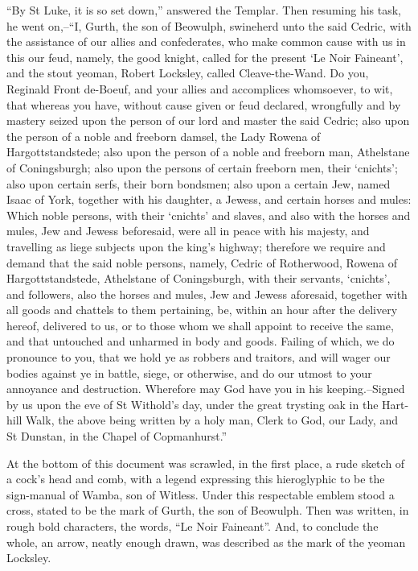 ``By St Luke, it is so set down,'' answered the Templar. Then resuming
his task, he went on,--``I, Gurth, the son of Beowulph, swineherd unto
the said Cedric, with the assistance of our allies and confederates, who
make common cause with us in this our feud, namely, the good knight,
called for the present `Le Noir Faineant', and the stout yeoman, Robert
Locksley, called Cleave-the-Wand. Do you, Reginald Front de-Boeuf, and
your allies and accomplices whomsoever, to wit, that whereas you have,
without cause given or feud declared, wrongfully and by mastery seized
upon the person of our lord and master the said Cedric; also upon the
person of a noble and freeborn damsel, the Lady Rowena of
Hargottstandstede; also upon the person of a noble and freeborn man,
Athelstane of Coningsburgh; also upon the persons of certain freeborn
men, their `cnichts'; also upon certain serfs, their born bondsmen; also
upon a certain Jew, named Isaac of York, together with his daughter, a
Jewess, and certain horses and mules: Which noble persons, with their
`cnichts' and slaves, and also with the horses and mules, Jew and Jewess
beforesaid, were all in peace with his majesty, and travelling as liege
subjects upon the king's highway; therefore we require and demand that
the said noble persons, namely, Cedric of Rotherwood, Rowena of
Hargottstandstede, Athelstane of Coningsburgh, with their servants,
`cnichts', and followers, also the horses and mules, Jew and Jewess
aforesaid, together with all goods and chattels to them pertaining, be,
within an hour after the delivery hereof, delivered to us, or to those
whom we shall appoint to receive the same, and that untouched and
unharmed in body and goods. Failing of which, we do pronounce to you,
that we hold ye as robbers and traitors, and will wager our bodies
against ye in battle, siege, or otherwise, and do our utmost to your
annoyance and destruction. Wherefore may God have you in his
keeping.--Signed by us upon the eve of St Withold's day, under the great
trysting oak in the Hart-hill Walk, the above being written by a holy
man, Clerk to God, our Lady, and St Dunstan, in the Chapel of
Copmanhurst.''

At the bottom of this document was scrawled, in the first place, a rude
sketch of a cock's head and comb, with a legend expressing this
hieroglyphic to be the sign-manual of Wamba, son of Witless. Under this
respectable emblem stood a cross, stated to be the mark of Gurth, the
son of Beowulph. Then was written, in rough bold characters, the words,
``Le Noir Faineant''. And, to conclude the whole, an arrow, neatly
enough drawn, was described as the mark of the yeoman Locksley.

